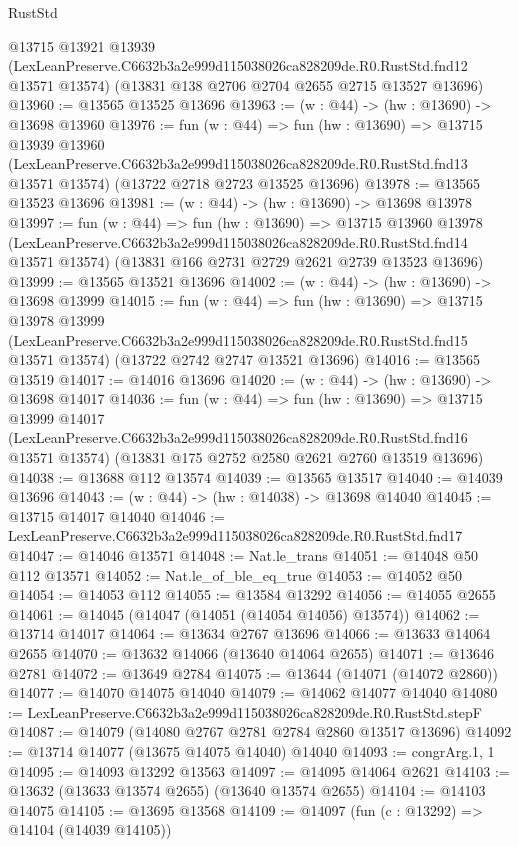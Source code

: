\begin{lexlean}{RustStd}
\begin{coremodule}
  @13715
    @13921
    @13939
    (LexLeanPreserve.C6632b3a2e999d115038026ca828209de.R0.RustStd.fnd12 @13571 @13574)
    (@13831 @138 @2706 @2704 @2655 @2715 @13527 @13696)
@13960 := @13565 @13525 @13696
@13963 := (w : @44) -> (hw : @13690) -> @13698 @13960
@13976 := fun (w : @44) =>
  fun (hw : @13690) =>
  @13715
    @13939
    @13960
    (LexLeanPreserve.C6632b3a2e999d115038026ca828209de.R0.RustStd.fnd13 @13571 @13574)
    (@13722 @2718 @2723 @13525 @13696)
@13978 := @13565 @13523 @13696
@13981 := (w : @44) -> (hw : @13690) -> @13698 @13978
@13997 := fun (w : @44) =>
  fun (hw : @13690) =>
  @13715
    @13960
    @13978
    (LexLeanPreserve.C6632b3a2e999d115038026ca828209de.R0.RustStd.fnd14 @13571 @13574)
    (@13831 @166 @2731 @2729 @2621 @2739 @13523 @13696)
@13999 := @13565 @13521 @13696
@14002 := (w : @44) -> (hw : @13690) -> @13698 @13999
@14015 := fun (w : @44) =>
  fun (hw : @13690) =>
  @13715
    @13978
    @13999
    (LexLeanPreserve.C6632b3a2e999d115038026ca828209de.R0.RustStd.fnd15 @13571 @13574)
    (@13722 @2742 @2747 @13521 @13696)
@14016 := @13565 @13519
@14017 := @14016 @13696
@14020 := (w : @44) -> (hw : @13690) -> @13698 @14017
@14036 := fun (w : @44) =>
  fun (hw : @13690) =>
  @13715
    @13999
    @14017
    (LexLeanPreserve.C6632b3a2e999d115038026ca828209de.R0.RustStd.fnd16 @13571 @13574)
    (@13831 @175 @2752 @2580 @2621 @2760 @13519 @13696)
@14038 := @13688 @112 @13574
@14039 := @13565 @13517
@14040 := @14039 @13696
@14043 := (w : @44) -> (hw : @14038) -> @13698 @14040
@14045 := @13715 @14017 @14040
@14046 := LexLeanPreserve.C6632b3a2e999d115038026ca828209de.R0.RustStd.fnd17
@14047 := @14046 @13571
@14048 := Nat.le_trans
@14051 := @14048 @50 @112 @13571
@14052 := Nat.le_of_ble_eq_true
@14053 := @14052 @50
@14054 := @14053 @112
@14055 := @13584 @13292
@14056 := @14055 @2655
@14061 := @14045 (@14047 (@14051 (@14054 @14056) @13574))
@14062 := @13714 @14017
@14064 := @13634 @2767 @13696
@14066 := @13633 @14064 @2655
@14070 := @13632 @14066 (@13640 @14064 @2655)
@14071 := @13646 @2781
@14072 := @13649 @2784
@14075 := @13644 (@14071 (@14072 @2860))
@14077 := @14070 @14075 @14040
@14079 := @14062 @14077 @14040
@14080 := LexLeanPreserve.C6632b3a2e999d115038026ca828209de.R0.RustStd.stepF
@14087 := @14079 (@14080 @2767 @2781 @2784 @2860 @13517 @13696)
@14092 := @13714 @14077 (@13675 @14075 @14040) @14040
@14093 := congrArg.{1, 1}
@14095 := @14093 @13292 @13563
@14097 := @14095 @14064 @2621
@14103 := @13632 (@13633 @13574 @2655) (@13640 @13574 @2655)
@14104 := @14103 @14075
@14105 := @13695 @13568
@14109 := @14097 (fun (c : @13292) => @14104 (@14039 @14105))

\end{coremodule}
\end{lexlean}
